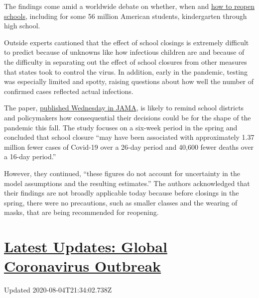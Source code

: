 The findings come amid a worldwide debate on whether, when and
\href{https://www.nytimes3xbfgragh.onion/interactive/2020/07/31/us/coronavirus-school-reopening-risk.html}{how
to reopen schools}, including for some 56 million American students,
kindergarten through high school.

Outside experts cautioned that the effect of school closings is
extremely difficult to predict because of unknowns like how infectious
children are and because of the difficulty in separating out the effect
of school closures from other measures that states took to control the
virus. In addition, early in the pandemic, testing was especially
limited and spotty, raising questions about how well the number of
confirmed cases reflected actual infections.

The paper,
\href{https://jamanetwork.com/journals/jama/fullarticle/10.1001/jama.2020.14348}{published
Wednesday in JAMA}, is likely to remind school districts and
policymakers how consequential their decisions could be for the shape of
the pandemic this fall. The study focuses on a six-week period in the
spring and concluded that school closure ``may have been associated with
approximately 1.37 million fewer cases of Covid-19 over a 26-day period
and 40,600 fewer deaths over a 16-day period.''

However, they continued, ``these figures do not account for uncertainty
in the model assumptions and the resulting estimates.'' The authors
acknowledged that their findings are not broadly applicable today
because before closings in the spring, there were no precautions, such
as smaller classes and the wearing of masks, that are being recommended
for reopening.

\hypertarget{latest-updates-global-coronavirus-outbreak}{%
\section{\texorpdfstring{\href{https://www.nytimes3xbfgragh.onion/2020/08/04/world/coronavirus-cases.html?action=click\&pgtype=Article\&state=default\&region=MAIN_CONTENT_1\&context=storylines_live_updates}{Latest
Updates: Global Coronavirus
Outbreak}}{Latest Updates: Global Coronavirus Outbreak}}\label{latest-updates-global-coronavirus-outbreak}}

Updated 2020-08-04T21:34:02.738Z

